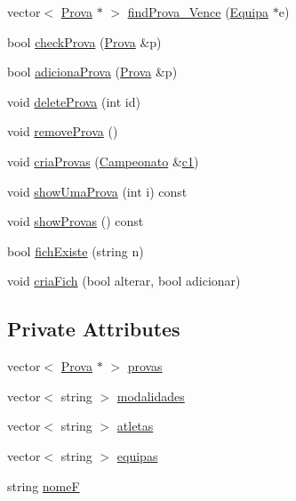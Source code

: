 \begin{DoxyCompactItemize}
\item 
vector$<$ \hyperlink{class_prova}{Prova} $\ast$ $>$ \hyperlink{class_calendario_a269e064b1ef6d757eff9b3bd185c6542}{find\+Prova\+\_\+\+Vence} (\hyperlink{class_equipa}{Equipa} $\ast$e)
\item 
bool \hyperlink{class_calendario_a912aa3dbadbdd82a002ccb251d5281fc}{check\+Prova} (\hyperlink{class_prova}{Prova} \&p)
\item 
bool \hyperlink{class_calendario_abf3471ce630be60d0658223017d47ec9}{adiciona\+Prova} (\hyperlink{class_prova}{Prova} \&p)
\item 
void \hyperlink{class_calendario_ade16f3f0e666b8b4dec08eec05caf707}{delete\+Prova} (int id)
\item 
void \hyperlink{class_calendario_a81be652b39d3c12492aae44b7d7d5603}{remove\+Prova} ()
\item 
void \hyperlink{class_calendario_a6a97d6bec106682ba1ec68f7b8339be0}{cria\+Provas} (\hyperlink{class_campeonato}{Campeonato} \&\hyperlink{main_8h_a4c89d9526ade3cc45c84a58a6319054a}{c1})
\item 
void \hyperlink{class_calendario_ae65b9add220bbfdf1f029816333aa656}{show\+Uma\+Prova} (int i) const 
\item 
void \hyperlink{class_calendario_af6bfda8df20c96b8e77773de3da16cee}{show\+Provas} () const 
\item 
bool \hyperlink{class_calendario_a84536a437d503ca5c200c103d480b0a8}{fich\+Existe} (string n)
\item 
void \hyperlink{class_calendario_ad2e3618170e62906c32fd072d75cf1a7}{cria\+Fich} (bool alterar, bool adicionar)
\end{DoxyCompactItemize}
\subsection*{Private Attributes}
\begin{DoxyCompactItemize}
\item 
vector$<$ \hyperlink{class_prova}{Prova} $\ast$ $>$ \hyperlink{class_calendario_a1c917a3325a0ebd6cbe186e976326d06}{provas}
\item 
vector$<$ string $>$ \hyperlink{class_calendario_a6a492724444ed6b468fe230d09fd800b}{modalidades}
\item 
vector$<$ string $>$ \hyperlink{class_calendario_abac0d74a48d544302a57fd3857ce3cf2}{atletas}
\item 
vector$<$ string $>$ \hyperlink{class_calendario_a4c49ca003a72d9d1aa32fcef57066467}{equipas}
\item 
string \hyperlink{class_calendario_ad14a413cc8b38380f6ea80f921cd16b4}{nome\+F}
\end{DoxyCompactItemize}


